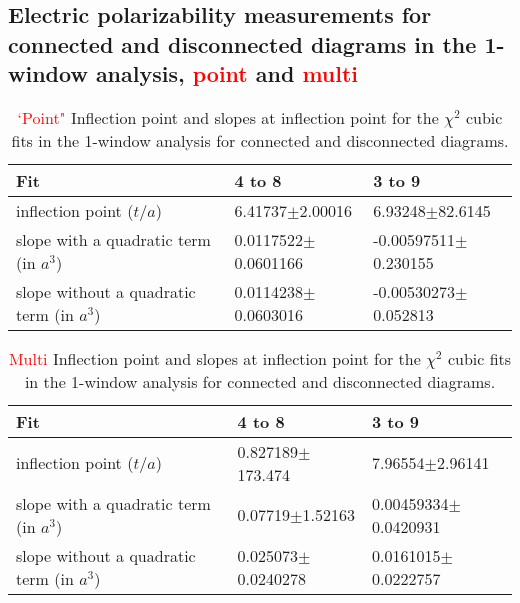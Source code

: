 \subsection{Electric polarizability measurements for connected and disconnected 
diagrams in the 1-window analysis, \textcolor{red}{point} and \textcolor{red}{multi}}
\begin{table}[H]
\begin{center}
    \begin{tabular}{ | p{2.7cm} | p{2.6cm} | p{2.6cm} | }
    \hline
     Fit   & 4 to 8   & 3 to 9  \\ \hline
     inflection point ($t/a$) &      6.41737$\pm$2.00016      &     6.93248$\pm$82.6145       \\ \hline
     slope with  a quadratic term (in $a^3$) &     0.0117522$\pm$0.0601166      &     -0.00597511$\pm$0.230155           \\ \hline
     slope without  a quadratic term (in $a^3$) &     0.0114238$\pm$0.0603016      &     -0.00530273$\pm$0.052813    \\ \hline
    \end{tabular}
\end{center}
\caption{\textcolor{red}{`Point"} Inflection point and slopes at inflection point for the $\chi^2$ cubic fits in the 1-window analysis for connected and disconnected diagrams.}
\label{tab:1walphaAllPoint}
\end{table}

\begin{table}[H]
\begin{center}
    \begin{tabular}{ | p{2.7cm} | p{2.6cm} | p{2.6cm} | }
    \hline
     Fit   & 4 to 8   & 3 to 9  \\ \hline
     inflection point ($t/a$) &      0.827189$\pm$173.474      &     7.96554$\pm$2.96141       \\ \hline
     slope with  a quadratic term (in $a^3$) &     0.07719$\pm$1.52163      &     0.00459334$\pm$0.0420931           \\ \hline
     slope without  a quadratic term (in $a^3$) &     0.025073$\pm$0.0240278      &     0.0161015$\pm$0.0222757    \\ \hline
    \end{tabular}
\end{center}
\caption{\textcolor{red}{Multi} Inflection point and slopes at inflection point for the $\chi^2$ cubic fits in the 1-window analysis for connected and disconnected diagrams.}
\label{tab:1walphaAllMulti}
\end{table}

